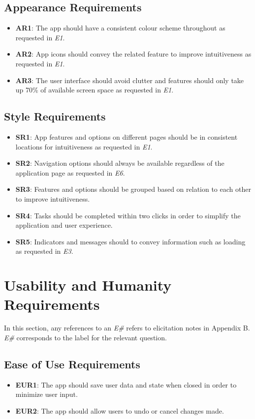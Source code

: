 \documentclass[12pt]{article}
\begin{document}
\subsection{Appearance Requirements}
\begin{itemize}
  \item \textbf{AR1}: The app should have a consistent colour scheme throughout as requested in \textit{E1}.
  \item \textbf{AR2}: App icons should convey the related feature to improve intuitiveness as requested in \textit{E1}.
  \item \textbf{AR3}: The user interface should avoid clutter and features should only take up 70\% of available screen space
  as requested in \textit{E1}.
\end{itemize}
\subsection{Style Requirements}
\begin{itemize}
  \item \textbf{SR1}: App features and options on different pages should be in consistent locations for intuitiveness as requested in \textit{E1}.
  \item \textbf{SR2}: Navigation options should always be available regardless of the application page as requested in \textit{E6}.
  \item \textbf{SR3}: Features and options should be grouped based on relation to each other to improve intuitiveness.
  \item \textbf{SR4}: Tasks should be completed within two clicks in order to simplify the application and user experience.
  \item \textbf{SR5}: Indicators and messages should to convey information such as loading as requested in \textit{E3}.
\end{itemize}

\section{Usability and Humanity Requirements}
In this section, any references to an \textit{E\#} refers to elicitation notes in Appendix B. \textit{E\#} corresponds
to the label for the relevant question.

\subsection{Ease of Use Requirements}
\begin{itemize}
  \item \textbf{EUR1}: The app should save user data and state when closed in order to minimize user input.
  \item \textbf{EUR2}: The app should allow users to undo or cancel changes made.
\end{itemize}
\end{document}
